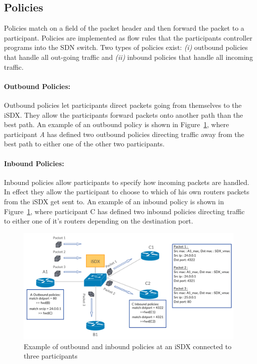 \subsection{\label{chapter2:iSDX:policies}Policies}
Policies match on a field of the packet header and then forward the packet to a participant. Policies are implemented as flow rules that the participants controller programs into the SDN switch. Two types of policies exist: \emph{(i)} outbound policies that handle all out-going traffic and \emph{(ii)} inbound policies that handle all incoming traffic.

\paragraph{\label{chapter2:iSDX:policies:outbound policies}Outbound Policies:}
Outbound policies let participants direct packets going from themselves to the iSDX. They allow the participants forward packets onto another path than the best path. An example of an outbound policy is shown in Figure~\ref{fig:isdx_policies}, where participant \emph{A} has defined two outbound policies directing traffic away from the best path to either one of the other two participants. 

\paragraph{\label{chapter2:iSDX:policies:inbound policies}Inbound Policies:}
Inbound policies allow participants to specify how incoming packets are handled. In effect they allow the participant to choose to which of his own routers packets from the iSDX get sent to. An example of an inbound policy is shown in Figure~\ref{fig:isdx_policies}, where participant C has defined two inbound policies directing traffic to either one of it's routers depending on the destination port. 

\begin{figure}[h]
\includegraphics[scale = 0.32]{Figures/bckgrnd_sdx_policies.pdf}
\caption{Example of outbound and inbound policies at an iSDX connected to three participants}
\label{fig:isdx_policies}
\end{figure}
  

